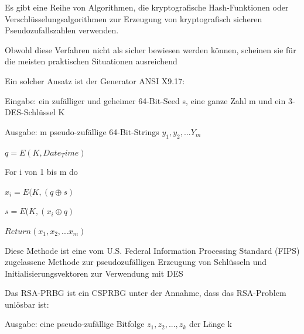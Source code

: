 \documentclass[a4paper]{article}
\begin{document}
\begin{multicols}{3}
      \begin{itemize*}
            \item Es gibt eine Reihe von Algorithmen, die kryptografische
            Hash-Funktionen oder Verschlüsselungsalgorithmen zur Erzeugung von
            kryptografisch sicheren Pseudozufallszahlen verwenden.
            \begin{itemize*}
                  \item Obwohl diese Verfahren nicht als sicher bewiesen werden können, scheinen sie für die meisten praktischen Situationen ausreichend
            \end{itemize*}
            \item Ein solcher Ansatz ist der Generator ANSI X9.17:
            \begin{itemize*}
                  \item Eingabe: ein zufälliger und geheimer 64-Bit-Seed s, eine ganze Zahl m und ein 3-DES-Schlüssel K
                  \item Ausgabe: m pseudo-zufällige 64-Bit-Strings $y_1,y_2,...Y_m$
                  \begin{enumerate*} \def\labelenumi{\arabic{enumi}.} \item $q = E(K, Date_Time)$ \item For i von 1 bis m do
                        \begin{enumerate*} \def\labelenumii{\arabic{enumii}.} \item $x_i = E(K, (q\oplus s)$ \item $s = E(K, (x_i\oplus q)$ \end{enumerate*} \item $Return(x_1,x_2,...x_m)$ \end{enumerate*}
                  \item Diese Methode ist eine vom U.S. Federal Information Processing Standard (FIPS) zugelassene Methode zur pseudozufälligen Erzeugung von Schlüsseln und Initialisierungsvektoren zur Verwendung mit DES
            \end{itemize*}
            \item Das RSA-PRBG ist ein CSPRBG unter der Annahme, dass das RSA-Problem
            unlösbar ist:
            \begin{itemize*}
                  \item Ausgabe: eine pseudo-zufällige Bitfolge $z_1,z_2,...,z_k$ der Länge k
            \end{itemize*}
            \begin{enumerate*}

\end{enumerate*}
\end{itemize*}
\end{multicols}
\end{document}
